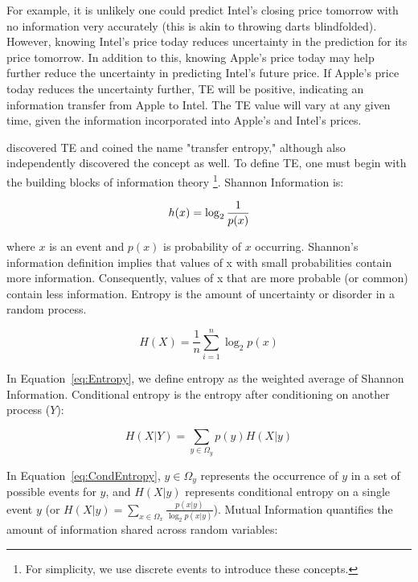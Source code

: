 For example, it is unlikely one could predict Intel's closing price tomorrow with no information very accurately (this is akin to throwing darts blindfolded).  However, knowing Intel's price today reduces uncertainty in the prediction for its price tomorrow.  In addition to this, knowing Apple's price today may help further reduce the uncertainty in predicting Intel's future price.  If Apple's price today reduces the uncertainty further, TE will be positive, indicating an information transfer from Apple to Intel.   The TE value will vary at any given time, given the information incorporated into Apple's and Intel's prices.

\cite{IntroToTransferEntropy} discovered TE and coined the name "transfer entropy," although  \cite{IntroToTransferEntropy2} also independently discovered the concept as well.  To define TE, one must begin with the building blocks of information theory \footnote{For simplicity, we use discrete events to introduce these concepts.}.  Shannon Information is: 

\begin{equation}
\label{{eq:shannonInfo}}
h(x) = \log_2 \frac{1}{p(x)}
\end{equation}

\noindent where \(x\) is an event and \(p(x)\) is probability of \(x\) occurring. Shannon's information definition implies that values of x with small probabilities contain more information. Consequently, values of x that are more probable (or common) contain less information. Entropy is the amount of uncertainty or disorder in a random process.

\begin{equation}
\label{eq:Entropy}
H(X) =  \frac{1}{n} \sum_{i=1}^n  \log_2 p(x)
\end{equation}


\noindent In Equation~\ref{eq:Entropy}, we define entropy as the weighted average of Shannon Information.  Conditional entropy is the entropy after conditioning on another process (\(Y\)):

\begin{equation}
\label{eq:CondEntropy}
H(X|Y) = \sum_{y \in \Omega_y} p(y) H(X|y)
\end{equation}

\noindent In Equation~\ref{eq:CondEntropy}, \(y \in \Omega_y\) represents the occurrence of \(y\) in a set of possible events for \(y\), and \(H(X|y)\) represents conditional entropy on a single event \(y\) (or \(H(X|y) = \sum_{x \in \Omega_x}  \frac{p(x|y)}{\log_2p(x|y)} \)). Mutual Information quantifies the amount of information shared across random variables:

